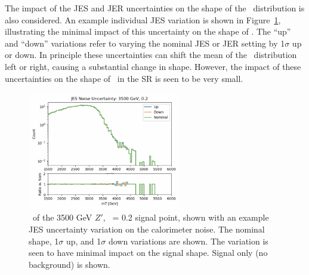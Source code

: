 The impact of the JES and JER uncertainties on the shape of the \mt~distribution is also considered.
An example individual JES variation is shown in Figure~\ref{fig:jes_uncert}, illustrating the minimal impact of this uncertainty on the shape of \mt.
The ``up'' and ``down'' variations refer to varying the nominal JES or JER setting by 1$\sigma$ up or down.
In principle these uncertainties can shift the mean of the \mt~distribution left or right, causing a substantial change in shape.
However, the impact of these uncertainties on the shape of \mt~in the SR is seen to be very small.
\begin{figure}[!htbp]
\centering
   \includegraphics[width=0.6\textwidth]{figures/results/jes}
    \caption{\mt~of the 3500 GeV $Z'$, \rinv~= 0.2 signal point, shown with an example JES uncertainty variation on the calorimeter noise. The nominal shape, 1$\sigma$ up, and 1$\sigma$ down variations are shown. The variation is seen to have minimal impact on the signal shape. Signal only (no background) is shown. 
    \label{fig:jes_uncert}}
\end{figure}

